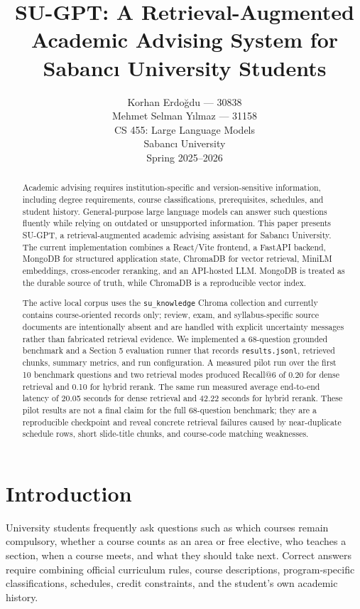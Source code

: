 \documentclass[11pt]{article}
\title{\vspace{-1.0cm}\textbf{SU-GPT: A Retrieval-Augmented Academic Advising System for Sabancı University Students}}
\author{Korhan Erdoğdu --- 30838\\Mehmet Selman Yılmaz --- 31158\\CS 455: Large Language Models\\Sabancı University\\Spring 2025--2026}
\date{}
\begin{document}
\setlength{\emergencystretch}{3em}
\maketitle

\begin{abstract}
Academic advising requires institution-specific and version-sensitive information, including degree requirements, course classifications, prerequisites, schedules, and student history. General-purpose large language models can answer such questions fluently while relying on outdated or unsupported information. This paper presents SU-GPT, a retrieval-augmented academic advising assistant for Sabancı University. The current implementation combines a React/Vite frontend, a FastAPI backend, MongoDB for structured application state, ChromaDB for vector retrieval, MiniLM embeddings, cross-encoder reranking, and an API-hosted LLM. MongoDB is treated as the durable source of truth, while ChromaDB is a reproducible vector index.

The active local corpus uses the \texttt{su\_knowledge} Chroma collection and currently contains course-oriented records only; review, exam, and syllabus-specific source documents are intentionally absent and are handled with explicit uncertainty messages rather than fabricated retrieval evidence. We implemented a 68-question grounded benchmark and a Section 5 evaluation runner that records \texttt{results.jsonl}, retrieved chunks, summary metrics, and run configuration. A measured pilot run over the first 10 benchmark questions and two retrieval modes produced Recall@6 of 0.20 for dense retrieval and 0.10 for hybrid rerank. The same run measured average end-to-end latency of 20.05 seconds for dense retrieval and 42.22 seconds for hybrid rerank. These pilot results are not a final claim for the full 68-question benchmark; they are a reproducible checkpoint and reveal concrete retrieval failures caused by near-duplicate schedule rows, short slide-title chunks, and course-code matching weaknesses.
\end{abstract}

\section{Introduction}
University students frequently ask questions such as which courses remain compulsory, whether a course counts as an area or free elective, who teaches a section, when a course meets, and what they should take next. Correct answers require combining official curriculum rules, course descriptions, program-specific classifications, schedules, credit constraints, and the student's own academic history.
\end{document}
